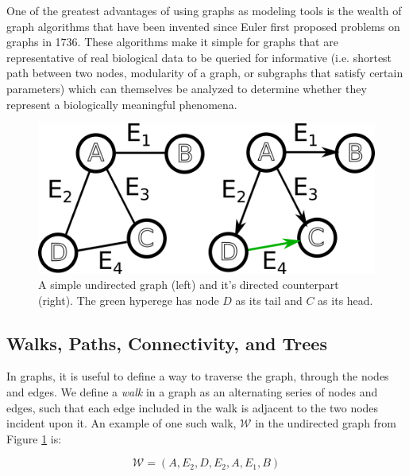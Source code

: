 \documentclass[12pt,twoside]{reedthesis}
\theoremstyle{definition}
\begin{document}
{  One of the greatest advantages of using graphs as modeling tools is the wealth of graph algorithms that have been invented since Euler first proposed problems on graphs in 1736. These algorithms make it simple for graphs that are representative of real biological data to be queried for informative (i.e. shortest path between two nodes, modularity of a graph, or subgraphs that satisfy certain parameters) which can themselves be analyzed to determine whether they represent a biologically meaningful phenomena.\par

  \begin{figure}[!h]
    \begin{center}
      \includegraphics[width=\textwidth/2]{simple_graph_du}
    \caption[Undirected \& Directed Graphs]{A simple undirected graph (left) and it's directed counterpart (right). The green hyperege has node $D$ as its tail and $C$ as its head.}
    \label{fig:simple_graph_du}
    \end{center}
  \end{figure}

   \subsection{Walks, Paths, Connectivity, and Trees}

   In graphs, it is useful to define a way to traverse the graph, through the nodes and edges. We define a \textit{walk} in a graph as an alternating series of nodes and edges, such that each edge included in the walk is adjacent to the two nodes incident upon it. An example of one such walk, $\mathcal{W}$ in the undirected graph from Figure \ref{fig:simple_graph_du} is:\par

   \begin{equation*}
     \mathcal{W} = (A,E_2,D,E_2,A,E_1,B)
   \end{equation*}

}
\end{document}

